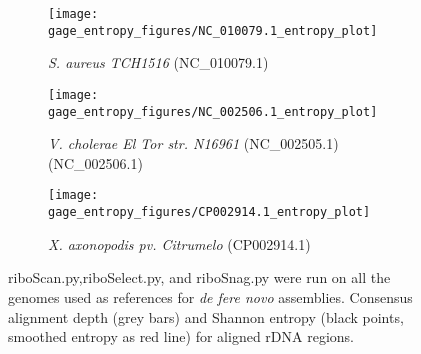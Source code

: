 \begin{figure}
  \centering
  \ContinuedFloat
  \begin{subfigure}[b]{.45\textwidth}
    \texttt{[image: gage\_entropy\_figures/NC\_010079.1\_entropy\_plot]}
    \caption{\textit{S. aureus TCH1516} (NC\_010079.1)}
    \label{fig:ent_tch}
  \end{subfigure}
  \begin{subfigure}[b]{.45\textwidth}
    \texttt{[image: gage\_entropy\_figures/NC\_002506.1\_entropy\_plot]}
    \caption{\textit{V. cholerae El Tor str. N16961} (NC\_002505.1) (NC\_002506.1)}
    \label{fig:ent_vib}
  \end{subfigure}
  \begin{subfigure}[b]{.45\textwidth}
    \texttt{[image: gage\_entropy\_figures/CP002914.1\_entropy\_plot]}
    \caption{\textit{X. axonopodis pv. Citrumelo} (CP002914.1)}
  \end{subfigure}
  \caption{riboScan.py,riboSelect.py, and riboSnag.py were run on all the genomes used as references for \textit{de fere novo} assemblies. Consensus alignment depth (grey bars) and Shannon entropy (black points, smoothed entropy as red line) for aligned rDNA regions.}
  \label{fig:ent_gage}

\end{figure}
